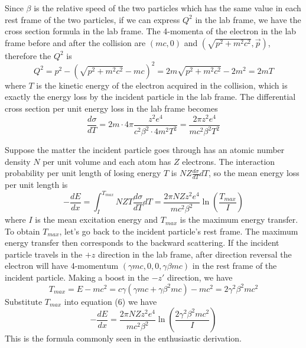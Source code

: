 \documentclass[11pt]{article} %
\begin{document}
Since $\beta$ is the relative speed of the two particles which has the same value in each rest frame of the two particles, if we can express $Q^2$ in the lab frame, we have the cross section formula in the lab frame. The 4-momenta of the electron in the lab frame before and after the collision are $(mc,0)$ and $(\sqrt{p^2+m^2c^2},\vec{p})$, therefore the $Q^2$ is
\begin{equation}
Q^2=p^2-\left( \sqrt{p^2+m^2c^2}-mc \right)^2=2m\sqrt{p^2+m^2c^2}-2m^2=2mT
\end{equation}
where $T$ is the kinetic energy of the electron acquired in the collision, which is exactly the energy loss by the incident particle in the lab frame. The differential cross section per unit energy loss in the lab frame becomes
\begin{equation}
\frac{d\sigma}{dT}=2m\cdot 4\pi\frac{z^2e^4}{c^2\beta^2\cdot 4m^2T^2}=\frac{2\pi z^2e^4}{mc^2\beta^2T^2}
\end{equation}

Suppose the matter the incident particle goes through has an atomic number density $N$ per unit volume and each atom has $Z$ electrons. The interaction probability per unit length of losing energy $T$ is $NZ\frac{d\sigma}{dT}dT$, so the mean energy loss per unit length is
\begin{equation}
-\frac{dE}{dx}=\int_I^{T_{max}}NZT\frac{d\sigma}{dT}dT=\frac{2\pi NZz^2e^4}{mc^2\beta^2}\ln\left( \frac{T_{max}}{I} \right)
\end{equation}
where $I$ is the mean excitation energy and $T_{max}$ is the maximum energy transfer. To obtain $T_{max}$, let's go back to the incident particle's rest frame. The maximum energy transfer then corresponds to the backward scattering. If the incident particle travels in the $+z$ direction in the lab frame, after direction reversal the electron will have 4-momentum $(\gamma mc,0,0,\gamma\beta mc)$ in the rest frame of the incident particle. Making a boost in the $-z'$ direction, we have
\begin{equation}
T_{max}=E-mc^2=c\gamma(\gamma mc+\gamma\beta^2mc)-mc^2 = 2\gamma^2\beta^2mc^2
\end{equation}
Substitute $T_{max}$ into equation (6) we have
\begin{equation}
-\frac{dE}{dx}=\frac{2\pi NZz^2e^4}{mc^2\beta^2}\ln\left( \frac{2\gamma^2\beta^2mc^2}{I} \right)
\end{equation}
This is the formula commonly seen in the enthusiastic derivation.
\end{document}
